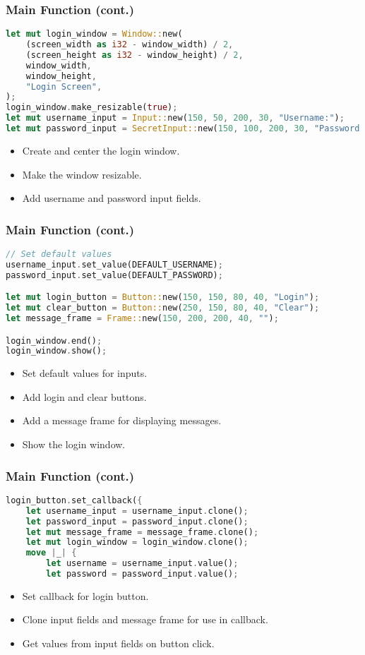 \documentclass[aspectratio=169, table]{beamer}
\begin{document}
\begin{frame}[fragile]
\frametitle{Main Function (cont.)}
\vspace{15pt}
\begin{lstlisting}[language=Rust]
let mut login_window = Window::new(
	(screen_width as i32 - window_width) / 2,
	(screen_height as i32 - window_height) / 2,
	window_width,
	window_height,
	"Login Screen",
);
login_window.make_resizable(true);
let mut username_input = Input::new(150, 50, 200, 30, "Username:");
let mut password_input = SecretInput::new(150, 100, 200, 30, "Password:");
\end{lstlisting}
\begin{itemize}
\item Create and center the login window.
\item Make the window resizable.
\item Add username and password input fields.
\end{itemize}
\end{frame}

\begin{frame}[fragile]
\frametitle{Main Function (cont.)}
\vspace{15pt}
\begin{lstlisting}[language=Rust]
// Set default values
username_input.set_value(DEFAULT_USERNAME);
password_input.set_value(DEFAULT_PASSWORD);

let mut login_button = Button::new(150, 150, 80, 40, "Login");
let mut clear_button = Button::new(250, 150, 80, 40, "Clear");
let message_frame = Frame::new(150, 200, 200, 40, "");

login_window.end();
login_window.show();
\end{lstlisting}
\begin{itemize}
\item Set default values for inputs.
\item Add login and clear buttons.
\item Add a message frame for displaying messages.
\item Show the login window.
\end{itemize}
\end{frame}

\begin{frame}[fragile]
\frametitle{Main Function (cont.)}
\begin{lstlisting}[language=Rust]
login_button.set_callback({
	let username_input = username_input.clone();
	let password_input = password_input.clone();
	let mut message_frame = message_frame.clone();
	let mut login_window = login_window.clone();
	move |_| {
		let username = username_input.value();
		let password = password_input.value();
	\end{lstlisting}
	\begin{itemize}
		\item Set callback for login button.
		\item Clone input fields and message frame for use in callback.
		\item Get values from input fields on button click.
	\end{itemize}
\end{frame}
\end{document}
